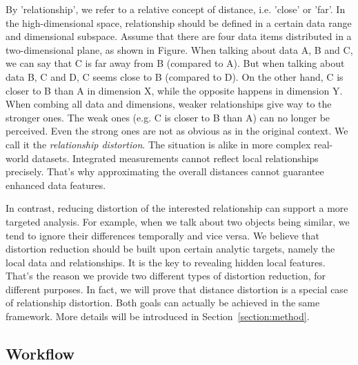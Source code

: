 {By 'relationship', we refer to a relative concept of distance, i.e. 'close' or 'far'. In the high-dimensional space, relationship should be defined in a certain data range and dimensional subspace. Assume that there are four data items distributed in a two-dimensional plane, as shown in Figure.  When talking about data A, B and C, we can say that C is far away from B (compared to A). But when talking about data B, C and D, C seems close to B (compared to D). On the other hand, C is closer to B than A in dimension X, while the opposite happens in dimension Y. When combing all data and dimensions, weaker relationships give way to the stronger ones. The weak ones (e.g. C is closer to B than A) can no longer be perceived. Even the strong ones are not as obvious as in the original context. We call it the \emph{relationship distortion}. The situation is alike in more complex real-world datasets. Integrated measurements cannot reflect local relationships precisely. That's why approximating the overall distances cannot guarantee enhanced data features.

In contrast, reducing distortion of the interested relationship can support a more targeted analysis. For example, when we talk about two objects being similar, we tend to ignore their differences temporally and vice versa. We believe that distortion reduction should be built upon certain analytic targets, namely the local data and relationships. It is the key to revealing hidden local features. That's the reason we provide two different types of distortion reduction, for different purposes. In fact, we will prove that distance distortion is a special case of relationship distortion. Both goals can actually be achieved in the same framework. More details will be introduced in Section~\ref{section:method}.

\subsection{Workflow}
}

